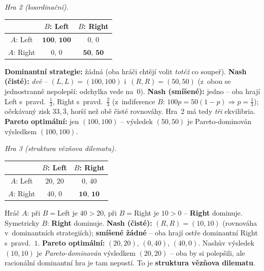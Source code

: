 \begin{priklad}
\smallskip
\emph{Hra 2 (koordinační).}
\begin{center}\small\renewcommand{\arraystretch}{1.2}
\begin{tabular}{|c|c|c|}
\hline
 & $B$: Left & $B$: Right \\
\hline
$A$: Left  & $\mathbf{100,\,100}$ & $0,\,0$ \\
\hline
$A$: Right & $0,\,0$ & $\mathbf{50,\,50}$ \\
\hline
\end{tabular}
\end{center}
\textbf{Dominantní strategie:} žádná (oba hráči chtějí volit \emph{totéž} co soupeř). \textbf{Nash (čisté):} \emph{dvě} -- $(L,L)=(100,100)$ i~$(R,R)=(50,50)$ (z~obou se jednostranně nepolepší: odchylka vede na~$0$). \textbf{Nash (smíšené):} jedno -- oba hrají Left s~pravd.\ $\tfrac13$, Right s~pravd.\ $\tfrac23$ (z~indiference $B$: $100p=50(1-p)\Rightarrow p=\tfrac13$); očekávaný zisk $33{,}\overline3$, horší než obě čisté rovnováhy. Hra~2 má tedy \emph{tři} ekvilibria. \textbf{Pareto optimální:} jen $(100,100)$ -- výsledek $(50,50)$ je Pareto-dominován výsledkem $(100,100)$.

\smallskip
\emph{Hra 3 (struktura vězňova dilematu).}
\begin{center}\small\renewcommand{\arraystretch}{1.2}
\begin{tabular}{|c|c|c|}
\hline
 & $B$: Left & $B$: Right \\
\hline
$A$: Left  & $20,\,20$ & $0,\,40$ \\
\hline
$A$: Right & $40,\,0$ & $\mathbf{10,\,10}$ \\
\hline
\end{tabular}
\end{center}
Hráč $A$: při $B=$Left je $40>20$, při $B=$Right je $10>0$ -- \textbf{Right} dominuje. Symetricky $B$: \textbf{Right} dominuje. \textbf{Nash (čisté):} $(R,R)=(10,10)$ (rovnováha v~dominantních strategiích); \textbf{smíšené žádné} -- oba hrají ostře dominantní Right s~pravd.\ $1$. \textbf{Pareto optimální:} $(20,20)$, $(0,40)$, $(40,0)$. Nashův výsledek $(10,10)$ je \emph{Pareto-dominován} výsledkem $(20,20)$ -- oba by si polepšili, ale racionální dominantní hra je tam nepustí. To je \textbf{struktura vězňova dilematu}.


\end{priklad}
